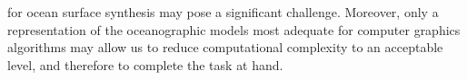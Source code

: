 for ocean surface synthesis may pose a significant challenge.
Moreover, only a representation of the oceanographic models most adequate for
computer graphics algorithms may allow us to reduce computational complexity to
an acceptable level, and therefore to complete the task at hand.
%
%
%
%
%
%
% 
% 
% 
%
%
%
